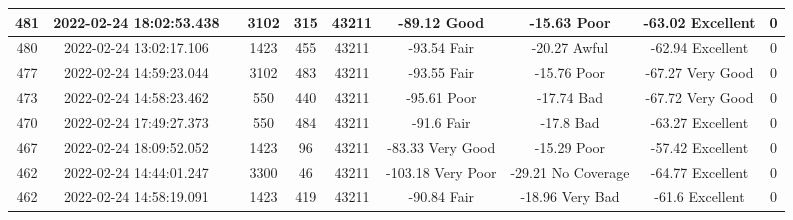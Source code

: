 \begin{longtable*}{|c|c|c|c|c|c|c|c|c|c|}
481&2022-02-24 18:02:53.438&&3102&315&43211& -89.12    Good        & -15.63    Poor        & -63.02    Excellent   & 0\\\hline
{}480&2022-02-24 13:02:17.106&&1423&455&43211& -93.54    Fair        & -20.27    Awful       & -62.94    Excellent   & 0\\\hline
{}477&2022-02-24 14:59:23.044&&3102&483&43211& -93.55    Fair        & -15.76    Poor        & -67.27    Very Good   & 0\\\hline
{}473&2022-02-24 14:58:23.462&&550&440&43211& -95.61    Poor        & -17.74    Bad         & -67.72    Very Good   & 0\\\hline
{}470&2022-02-24 17:49:27.373&&550&484&43211& -91.6     Fair        & -17.8     Bad         & -63.27    Excellent   & 0\\\hline
{}467&2022-02-24 18:09:52.052&&1423&96&43211& -83.33    Very Good   & -15.29    Poor        & -57.42    Excellent   & 0\\\hline
{}462&2022-02-24 14:44:01.247&&3300&46&43211& -103.18   Very Poor   & -29.21    No Coverage & -64.77    Excellent   & 0\\\hline
{}462&2022-02-24 14:58:19.091&&1423&419&43211& -90.84    Fair        & -18.96    Very Bad    & -61.6     Excellent   & 0\\\hline

\end{longtable*}
